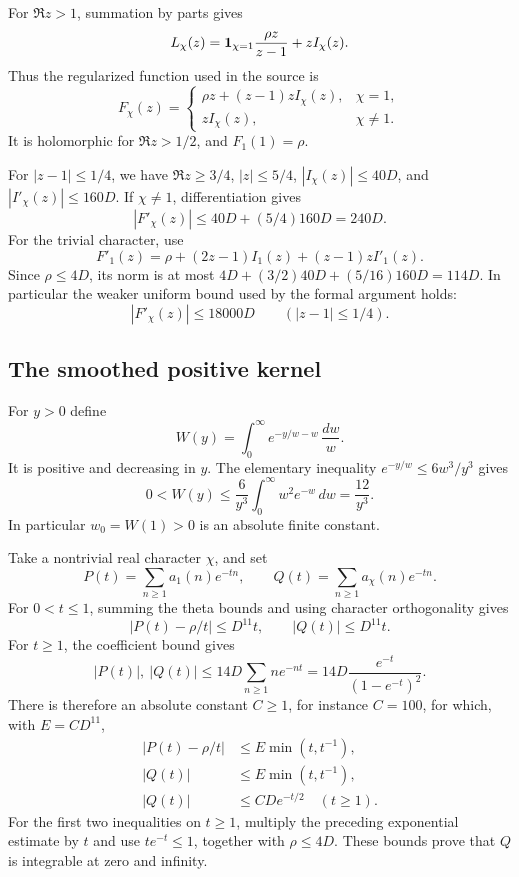For \(\Re z>1\), summation by parts gives
\[
       L_\chi(z)
          ={\bf1}_{\chi=1}\frac{\rho z}{z-1}
                              +zI_\chi(z).
\]
Thus the regularized function used in the source is
\[
 F_\chi(z)=
 \begin{cases}
   \rho z+(z-1)zI_\chi(z),&\chi=1,\\
   zI_\chi(z),&\chi\ne1.
 \end{cases}
\]
It is holomorphic for \(\Re z>1/2\), and \(F_1(1)=\rho\).

For \(|z-1|\leq1/4\), we have
\(\Re z\geq3/4\), \(|z|\leq5/4\),
\(|I_\chi(z)|\leq40D\), and \(|I'_\chi(z)|\leq160D\).
If \(\chi\ne1\), differentiation gives
\[
                   |F'_\chi(z)|\leq40D+(5/4)160D=240D.
\]
For the trivial character, use
\[
 F'_1(z)=\rho+(2z-1)I_1(z)+(z-1)zI'_1(z).
\]
Since \(\rho\leq4D\), its norm is at most
\(4D+(3/2)40D+(5/16)160D=114D\).
In particular the weaker uniform bound used by the formal argument holds:
\begin{equation}
 \label{eq:ray-derivative-bound}
                 |F'_\chi(z)|\leq18000D
                             \qquad(|z-1|\leq1/4).
\end{equation}

\subsection{The smoothed positive kernel}

For \(y>0\) define
\[
            W(y)=\int_0^\infty e^{-y/w-w}\,\frac{dw}{w}.
\]
It is positive and decreasing in \(y\).
The elementary inequality
\(e^{-y/w}\leq6w^3/y^3\) gives
\[
           0<W(y)\leq\frac6{y^3}
                       \int_0^\infty w^2e^{-w}\,dw
                     =\frac{12}{y^3}.
\]
In particular \(w_0=W(1)>0\) is an absolute finite constant.

Take a nontrivial real character \(\chi\), and set
\[
       P(t)=\sum_{n\geq1}a_1(n)e^{-tn},\qquad
       Q(t)=\sum_{n\geq1}a_\chi(n)e^{-tn}.
\]
For \(0<t\leq1\), summing the theta bounds and using character
orthogonality gives
\[
       |P(t)-\rho/t|\leq D^{11}t,\qquad
                          |Q(t)|\leq D^{11}t.
\]
For \(t\geq1\), the coefficient bound gives
\[
 |P(t)|,\ |Q(t)|
       \leq14D\sum_{n\geq1}ne^{-nt}
       =14D\frac{e^{-t}}{(1-e^{-t})^2}.
\]
There is therefore an absolute constant \(C\geq1\), for instance
\(C=100\), for which, with \(E=CD^{11}\),
\begin{equation}
 \label{eq:ray-theta-kernel-bounds}
 \begin{split}
       |P(t)-\rho/t|&\leq E\min(t,t^{-1}),\\
                    |Q(t)|&\leq E\min(t,t^{-1}),\\
       |Q(t)|&\leq CD e^{-t/2}\quad(t\geq1).
 \end{split}
\end{equation}
For the first two inequalities on \(t\geq1\), multiply the
preceding exponential estimate by \(t\) and use \(te^{-t}\leq1\),
together with \(\rho\leq4D\).
These bounds prove that \(Q\) is integrable at zero and infinity.

